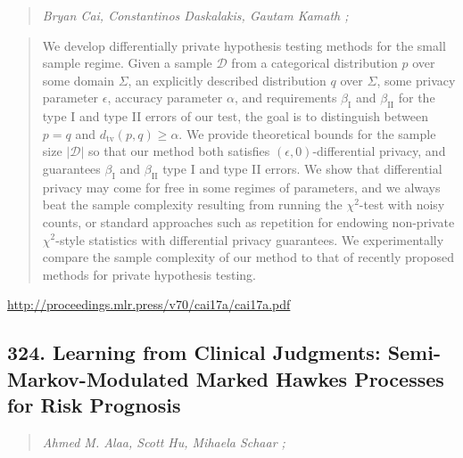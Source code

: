\documentclass{article}
\begin{document}
\begin{quote}
\footnotesize{\textit{Bryan Cai, Constantinos Daskalakis, Gautam Kamath ;}}

\end{quote}

\begin{quote}
    We develop differentially private hypothesis testing methods for the small sample regime. Given a sample $\mathcal{D}$ from a categorical distribution $p$ over some domain $\Sigma$, an explicitly described distribution $q$ over $\Sigma$, some privacy parameter $\epsilon$, accuracy parameter $\alpha$, and requirements $\beta_\mathrm{I}$ and $\beta_\mathrm{II}$ for the type I and type II errors of our test, the goal is to distinguish between $p=q$ and $d_\mathrm{tv}(p,q) \ge \alpha$. We provide theoretical bounds for the sample size $|\mathcal{D}|$ so that our method both satisfies $(\epsilon,0)$-differential privacy, and guarantees $\beta_\mathrm{I}$ and $\beta_\mathrm{II}$ type I and type II errors. We show that differential privacy may come for free in some regimes of parameters, and we always beat the sample complexity resulting from running the $\chi^2$-test with noisy counts, or standard approaches such as repetition for endowing non-private $\chi^2$-style statistics with differential privacy guarantees. We experimentally compare the sample complexity of our method to that of recently proposed methods for private hypothesis testing.  
\end{quote}

\href{http://proceedings.mlr.press/v70/cai17a/cai17a.pdf}{http://proceedings.mlr.press/v70/cai17a/cai17a.pdf}

\subsection{324. Learning from Clinical Judgments: Semi-Markov-Modulated Marked Hawkes Processes for Risk Prognosis}

\begin{quote}
\footnotesize{\textit{Ahmed M. Alaa, Scott Hu, Mihaela Schaar ;}}

\end{quote}
\end{document}
